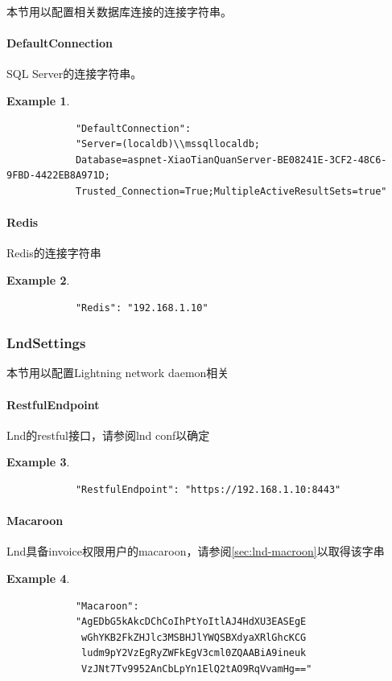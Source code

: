 \documentclass[a4paper,11pt]{article}
\theoremstyle{definition}
\newtheorem{exmp}{Example}[section]
\begin{document}
本节用以配置相关数据库连接的连接字符串。

\paragraph{DefaultConnection}


SQL Server的连接字符串。
    \begin{exmp}
        \begin{lstlisting}
            "DefaultConnection":
            "Server=(localdb)\\mssqllocaldb;
            Database=aspnet-XiaoTianQuanServer-BE08241E-3CF2-48C6-9FBD-4422EB8A971D;
            Trusted_Connection=True;MultipleActiveResultSets=true"
        \end{lstlisting}
    \end{exmp}

\paragraph{Redis}


Redis的连接字符串
    \begin{exmp}
        \begin{lstlisting}
            "Redis": "192.168.1.10"
        \end{lstlisting}
    \end{exmp}

\subsubsection{LndSettings}
本节用以配置Lightning network daemon相关

\paragraph{RestfulEndpoint}


Lnd的restful接口，请参阅lnd conf以确定
    \begin{exmp}
        \begin{lstlisting}
            "RestfulEndpoint": "https://192.168.1.10:8443"
        \end{lstlisting}
    \end{exmp}

\paragraph{Macaroon}


Lnd具备invoice权限用户的macaroon，请参阅\ref{sec:lnd-macroon}以取得该字串
    \begin{exmp}
        \begin{lstlisting}
            "Macaroon":
            "AgEDbG5kAkcDChCoIhPtYoItlAJ4HdXU3EASEgE
             wGhYKB2FkZHJlc3MSBHJlYWQSBXdyaXRlGhcKCG
             ludm9pY2VzEgRyZWFkEgV3cml0ZQAABiA9ineuk
             VzJNt7Tv9952AnCbLpYn1ElQ2tAO9RqVvamHg=="
        \end{lstlisting}
    \end{exmp}
\end{document}
